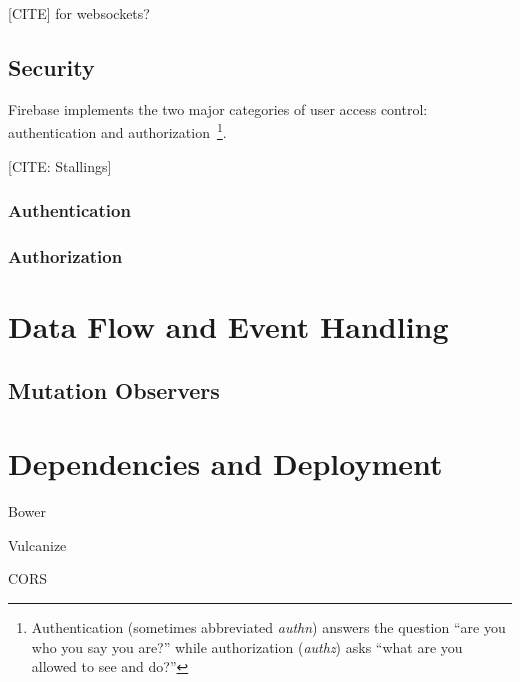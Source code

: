 [CITE] for websockets?

\subsection{Security}
Firebase implements the two major categories of user access control: authentication and 
authorization~\footnote{
Authentication (sometimes abbreviated \textit{authn}) answers the question ``are you who you say you are?'' 
while authorization (\textit{authz}) asks ``what are you allowed to see and do?''}.

[CITE: Stallings]

\subsubsection{Authentication}

\subsubsection{Authorization}


\section{Data Flow and Event Handling}

\subsection{Mutation Observers}

\section{Dependencies and Deployment}

Bower

Vulcanize

CORS

